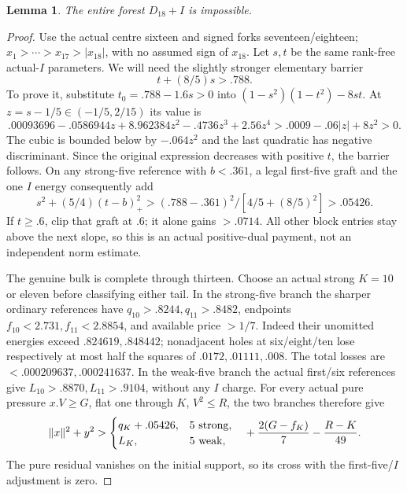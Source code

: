 \documentclass[11pt]{article}
\newtheorem{lemma}[theorem]{Lemma}
\theoremstyle{definition}
\theoremstyle{remark}
\newcommand{\norm}[1]{\lVert #1\rVert}
\begin{document}
\begin{lemma}\label{app:tail:lem:D18I}
The entire forest $D_{18}+I$ is impossible.
\end{lemma}
\begin{proof}
Use the actual centre sixteen and signed forks seventeen/eighteen;
$x_1>\cdots>x_{17}>|x_{18}|$, with no assumed sign of $x_{18}$.
Let $s,t$ be the same rank-free actual-$I$ parameters.
We will need the slightly stronger elementary barrier
\begin{equation}\label{app:tail:eq:I788}
 t+(8/5)s>.788.
\end{equation}
To prove it, substitute $t_0=.788-1.6s>0$ into
$(1-s^2)(1-t^2)-8st$.
At $z=s-1/5\in(-1/5,2/15)$ its value is
\[
 .00093696-.0586944z+8.962384z^2-.4736z^3+2.56z^4
 >.0009-.06|z|+8z^2>0.
\]
The cubic is bounded below by $-.064z^2$ and the last
quadratic has negative discriminant. Since the original
expression decreases with positive $t$, the barrier follows.
On any strong-five reference with $b<.361$, a legal first-five
graft and the one $I$ energy consequently add
\[
 s^2+(5/4)(t-b)_+^2>
 (.788-.361)^2/[4/5+(8/5)^2]>.05426.
\]
If $t\ge.6$, clip that graft at $.6$; it alone gains $>.0714$.
All other block entries stay above the next slope, so this is
an actual positive-dual payment, not an independent norm estimate.

The genuine bulk is complete through thirteen. Choose an actual
strong $K=10$ or eleven before classifying either tail.
In the strong-five branch the sharper ordinary references have
$q_{10}>.8244,q_{11}>.8482$, endpoints
$f_{10}<2.731,f_{11}<2.8854$, and available price $>1/7$.
Indeed their unomitted energies exceed $.824619,.848442$;
nonadjacent holes at six/eight/ten lose respectively at most
half the squares of $.0172,.01111,.008$.
The total losses are $<.000209637,.000241637$.
In the weak-five branch the actual first/six references give
$L_{10}>.8870,L_{11}>.9104$, without any $I$ charge.
For every actual pure pressure $x.V\ge G$, flat one through
$K$, $V^2\le R$, the two branches therefore give
\begin{equation}\label{app:tail:eq:D18Ipurepay}
 \norm x^2+y^2>
 \begin{cases}q_K+.05426,&5\text{ strong},\\L_K,&5\text{ weak},\end{cases}
 \quad +{2(G-f_K)\over7}-{R-K\over49}.
\end{equation}
The pure residual vanishes on the initial support, so its
cross with the first-five/$I$ adjustment is zero.


\end{proof}
\end{document}
